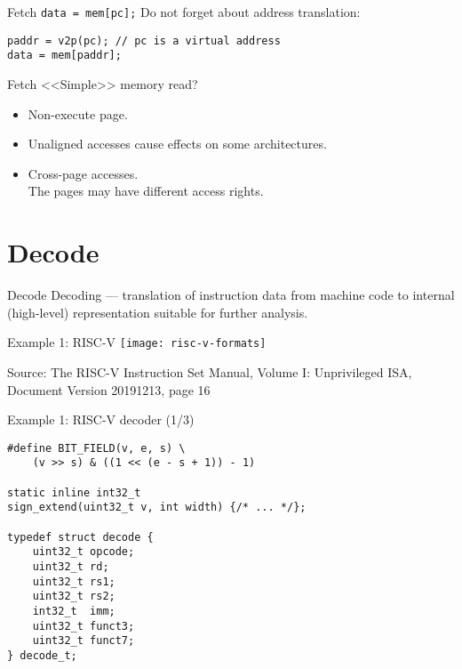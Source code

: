 \begin{frame}[fragile]{Fetch}
\texttt{data = mem[pc];}\pause
\vfill
Do not forget about address translation:
\begin{lstlisting}
paddr = v2p(pc); // pc is a virtual address
data = mem[paddr];
\end{lstlisting}
\end{frame}


\begin{frame}{Fetch}
<<Simple>> memory read?
\pause\bigskip
\begin{itemize}
\item Non-execute page.
\pause\bigskip
\item Unaligned accesses cause effects on some architectures.
\pause\bigskip
\item Cross-page accesses. \\
The pages may have different access rights.
\end{itemize}
\end{frame}

\section{Decode}

\begin{frame}{Decode}
Decoding --- translation of instruction data from machine code to internal
(high-level) representation suitable for further analysis.
\end{frame}

\begin{frame}{Example 1: RISC-V}
\centering
\texttt{[image: risc-v-formats]}

\tiny{Source: The RISC-V Instruction Set Manual, Volume I: Unprivileged ISA,
      Document Version 20191213, page 16}
\end{frame}

\begin{frame}[fragile]{Example 1: RISC-V decoder (1/3)}
\begin{lstlisting}
#define BIT_FIELD(v, e, s) \
    (v >> s) & ((1 << (e - s + 1)) - 1)

static inline int32_t
sign_extend(uint32_t v, int width) {/* ... */};

typedef struct decode {
    uint32_t opcode;
    uint32_t rd;
    uint32_t rs1;
    uint32_t rs2;
    int32_t  imm;
    uint32_t funct3;
    uint32_t funct7;
} decode_t;
\end{lstlisting}
\end{frame}


